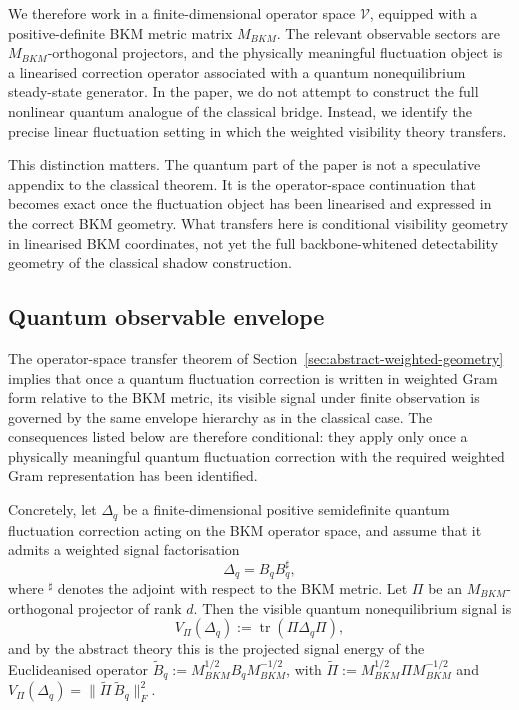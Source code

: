 \documentclass[11pt,a4paper]{article}
\numberwithin{equation}{section}
\theoremstyle{thmcompact}
\theoremstyle{remark}
\begin{document}
We therefore work in a finite-dimensional operator space \(\mathcal V\), equipped with a positive-definite BKM metric matrix \(M_{BKM}\). The relevant observable sectors are \(M_{BKM}\)-orthogonal projectors, and the physically meaningful fluctuation object is a linearised correction operator associated with a quantum nonequilibrium steady-state generator. In the paper, we do not attempt to construct the full nonlinear quantum analogue of the classical bridge. Instead, we identify the precise linear fluctuation setting in which the weighted visibility theory transfers.

This distinction matters. The quantum part of the paper is not a speculative appendix to the classical theorem. It is the operator-space continuation that becomes exact once the fluctuation object has been linearised and expressed in the correct BKM geometry. What transfers here is conditional visibility geometry in linearised BKM coordinates, not yet the full backbone-whitened detectability geometry of the classical shadow construction.

\subsection{Quantum observable envelope}

The operator-space transfer theorem of Section~\ref{sec:abstract-weighted-geometry} implies that once a quantum fluctuation correction is written in weighted Gram form relative to the BKM metric, its visible signal under finite observation is governed by the same envelope hierarchy as in the classical case. The consequences listed below are therefore conditional: they apply only once a physically meaningful quantum fluctuation correction with the required weighted Gram representation has been identified.

Concretely, let \(\Delta_q\) be a finite-dimensional positive semidefinite quantum fluctuation correction acting on the BKM operator space, and assume that it admits a weighted signal factorisation
\begin{equation}
\Delta_q = B_q B_q^{\sharp},
\end{equation}
where \(^{\sharp}\) denotes the adjoint with respect to the BKM metric. Let \(\Pi\) be an \(M_{BKM}\)-orthogonal projector of rank \(d\). Then the visible quantum nonequilibrium signal is
\begin{equation}
V_\Pi(\Delta_q):=\operatorname{tr}(\Pi\Delta_q\Pi),
\end{equation}
and by the abstract theory this is the projected signal energy of the Euclideanised operator \(\widetilde B_q:=M_{BKM}^{1/2}B_qM_{BKM}^{-1/2}\), with \(\widetilde\Pi:=M_{BKM}^{1/2}\Pi M_{BKM}^{-1/2}\) and \(V_\Pi(\Delta_q)=\|\widetilde\Pi\,\widetilde B_q\|_F^2\).
\end{document}

